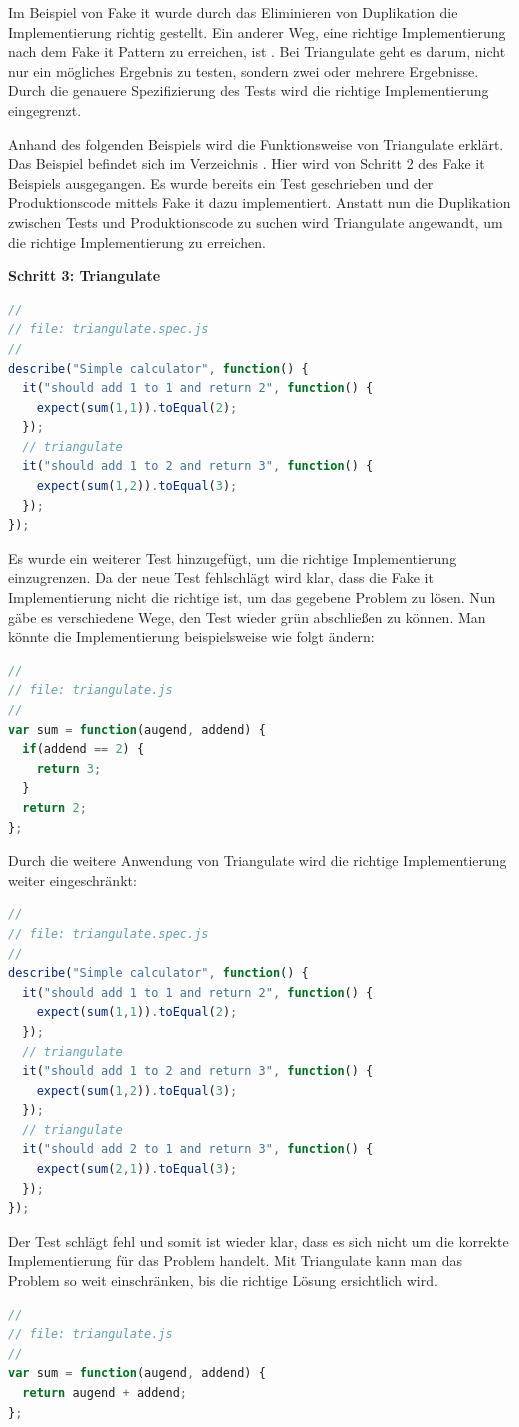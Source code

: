 Im Beispiel von Fake it wurde durch das Eliminieren von Duplikation die Implementierung richtig gestellt. Ein anderer Weg, eine richtige Implementierung nach dem Fake it Pattern zu erreichen, ist . Bei Triangulate geht es darum, nicht nur ein mögliches Ergebnis zu testen, sondern zwei oder mehrere Ergebnisse. Durch die genauere Spezifizierung des Tests wird die richtige Implementierung eingegrenzt.

Anhand des folgenden Beispiels wird die Funktionsweise von Triangulate erklärt. Das Beispiel befindet sich im Verzeichnis .
Hier wird von Schritt 2 des Fake it Beispiels ausgegangen. Es wurde bereits ein Test geschrieben und der Produktionscode mittels Fake it dazu implementiert. Anstatt nun die Duplikation zwischen Tests und Produktionscode zu suchen wird Triangulate angewandt, um die richtige Implementierung zu erreichen.

\textbf{Schritt 3: Triangulate}
\begin{lstlisting}[language=JavaScript]
//
// file: triangulate.spec.js
//
describe("Simple calculator", function() {
  it("should add 1 to 1 and return 2", function() {
    expect(sum(1,1)).toEqual(2);
  });
  // triangulate
  it("should add 1 to 2 and return 3", function() {
    expect(sum(1,2)).toEqual(3);
  });
});
\end{lstlisting}

Es wurde ein weiterer Test hinzugefügt, um die richtige Implementierung einzugrenzen. Da der neue Test fehlschlägt wird klar, dass die Fake it Implementierung nicht die richtige ist, um das gegebene Problem zu lösen. Nun gäbe es verschiedene Wege, den Test wieder grün abschließen zu können. Man könnte die Implementierung beispielsweise wie folgt ändern:

\begin{lstlisting}[language=JavaScript]
//
// file: triangulate.js
//
var sum = function(augend, addend) {
  if(addend == 2) {
    return 3;
  }
  return 2;
};
\end{lstlisting}

Durch die weitere Anwendung von Triangulate wird die richtige Implementierung weiter eingeschränkt:
\begin{lstlisting}[language=JavaScript]
//
// file: triangulate.spec.js
//
describe("Simple calculator", function() {
  it("should add 1 to 1 and return 2", function() {
    expect(sum(1,1)).toEqual(2);
  });
  // triangulate
  it("should add 1 to 2 and return 3", function() {
    expect(sum(1,2)).toEqual(3);
  });
  // triangulate
  it("should add 2 to 1 and return 3", function() {
    expect(sum(2,1)).toEqual(3);
  });
});

\end{lstlisting}
Der Test schlägt fehl und somit ist wieder klar, dass es sich nicht um die korrekte Implementierung für das Problem handelt. Mit Triangulate kann man das Problem so weit einschränken, bis die richtige Lösung ersichtlich wird.
\begin{lstlisting}[language=JavaScript]
//
// file: triangulate.js
//
var sum = function(augend, addend) {
  return augend + addend;
};
\end{lstlisting}

